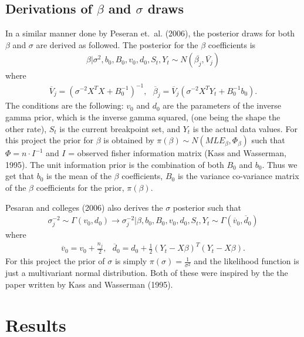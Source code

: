 \documentclass[submit]{smj}
\begin{document}
\subsection{Derivations of $\beta$ and $\sigma$ draws}
In a similar manner done by Peseran et.~al. (2006), the posterior draws for both $\beta$ and $\sigma$ are derived as followed.  The posterior for the $\beta$ coefficients is 
\begin{align*}
\beta | \sigma^2, b_0, B_0, v_0, d_0 , S_{t}, Y_{t} \sim N( \overline{\beta_j } , \overline{V_j} )
\end{align*}
where 
\begin{align*}
\overline{V}_j = (\sigma^{-2}X^T X + B_0^{-1})^{-1}, \ \ \  \overline{\beta}_j = \overline{V}_j(\sigma^{-2} X^T Y_t + B_0^{-1}b_0).
\end{align*}
The conditions are the following:  $v_0$ and $d_0$ are the parameters of the inverse gamma prior, which is the inverse gamma squared, (one being the shape the other rate), $S_t$ is the current breakpoint set, and $Y_t$ is the actual data values. For this project the prior for $\beta$ is obtained by  $\pi(\beta) \sim N(MLE_{\beta}, \Phi_{\beta})$ such that $\Phi = n \cdot I^{-1}$ and $I$ = observed fisher information matrix (Kass and Wasserman, 1995). The unit information prior is the combination of both $B_0$ and $b_0$. Thus we get that $b_0$ is the mean of the $\beta$ coefficients, $B_0$ is the variance co-variance matrix of the $\beta$ coefficients for the prior, $\pi(\beta)$. 

Pesaran and colleges (2006) also derives the $\sigma$ posterior such that 
\begin{align*}
\sigma_j^{-2} \sim  \Gamma(v_0, d_0) \longrightarrow \sigma^{-2}_j | \beta, b_0, B_0, v_0, d_0 , S_{t}, Y_{t} \sim \Gamma ( \overline{v}_0,  \overline{d}_0)
\end{align*}
where 
\begin{align*}
\overline{v}_0 = v_0 + \frac{n_j}{2} , \ \ \  \overline{d}_0 = d_0 + \frac{1}{2}(Y_t-X\beta)^T(Y_t- X \beta).
\end{align*}
For this project the prior of $\sigma$ is simply $\pi(\sigma) = \frac{1}{\sigma^2}$ and the likelihood function is just a multivariant normal distribution. Both of these were inspired by the the paper written by Kass and Wasserman (1995). 


\section{Results}
\end{document}
